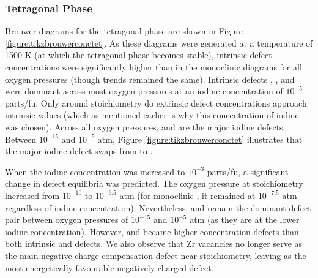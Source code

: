 
\subsubsection*{Tetragonal Phase}

Brouwer diagrams for the tetragonal phase are shown in Figure \ref{figure:tikzbrouwerconctet}. As these diagrams were generated at a temperature of 1500 K (at which the tetragonal phase becomes stable), intrinsic defect concentrations were significantly higher than in the monoclinic diagrams for all oxygen pressures (though trends remained the same). Intrinsic defects , ,  and  were dominant across most oxygen pressures at an iodine concentration of $10^{-5}$ parts/fu. Only around stoichiometry do extrinsic defect concentrations approach intrinsic values (which as mentioned earlier is why this concentration of iodine was chosen). Across all oxygen pressures,  and  are the major iodine defects. Between $10^{-15}$ and $10^{-5}$ atm, Figure \ref{figure:tikzbrouwerconctet} illustrates that the major iodine defect swaps from  to . 

When the iodine concentration was increased to $10^{-3}$ parts/fu, a significant change in defect equilibria was predicted. The oxygen pressure at stoichiometry increased from $10^{-10}$ to $10^{-6.5}$ atm (for monoclinic \zirconia, it remained at $10^{-7.5}$ atm regardless of iodine concentration). Nevertheless,  and  remain the dominant defect pair between oxygen pressures of $10^{-15}$ and $10^{-5}$ atm (as they are at the lower iodine concentration). However,  and  became higher concentration defects than both intrinsic  and  defects. We also observe that Zr vacancies no longer serve as the main negative charge-compensation defect near stoichiometry, leaving  as the most energetically favourable negatively-charged defect.  

